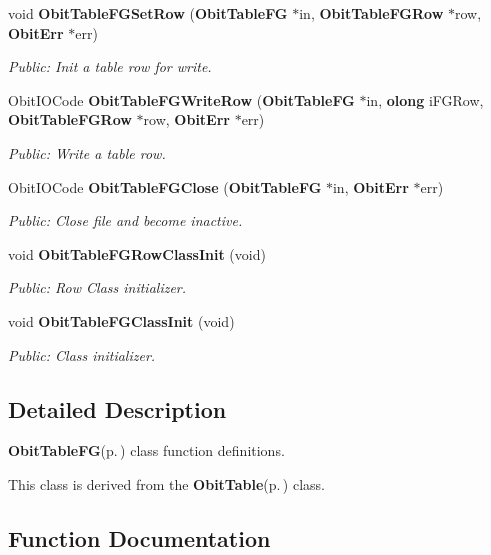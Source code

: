 \begin{CompactItemize}
void {\bf Obit\-Table\-FGSet\-Row} ({\bf Obit\-Table\-FG} $\ast$in, {\bf Obit\-Table\-FGRow} $\ast$row, {\bf Obit\-Err} $\ast$err)
\begin{CompactList}\small\item\em Public: Init a table row for write. \item\end{CompactList}\item 
Obit\-IOCode {\bf Obit\-Table\-FGWrite\-Row} ({\bf Obit\-Table\-FG} $\ast$in, {\bf olong} i\-FGRow, {\bf Obit\-Table\-FGRow} $\ast$row, {\bf Obit\-Err} $\ast$err)
\begin{CompactList}\small\item\em Public: Write a table row. \item\end{CompactList}\item 
Obit\-IOCode {\bf Obit\-Table\-FGClose} ({\bf Obit\-Table\-FG} $\ast$in, {\bf Obit\-Err} $\ast$err)
\begin{CompactList}\small\item\em Public: Close file and become inactive. \item\end{CompactList}\item 
void {\bf Obit\-Table\-FGRow\-Class\-Init} (void)
\begin{CompactList}\small\item\em Public: Row Class initializer. \item\end{CompactList}\item 
void {\bf Obit\-Table\-FGClass\-Init} (void)
\begin{CompactList}\small\item\em Public: Class initializer. \item\end{CompactList}\end{CompactItemize}


\subsection{Detailed Description}
{\bf Obit\-Table\-FG}{\rm (p.\,\pageref{structObitTableFG})} class function definitions. 

This class is derived from the {\bf Obit\-Table}{\rm (p.\,\pageref{structObitTable})} class.

\subsection{Function Documentation}

